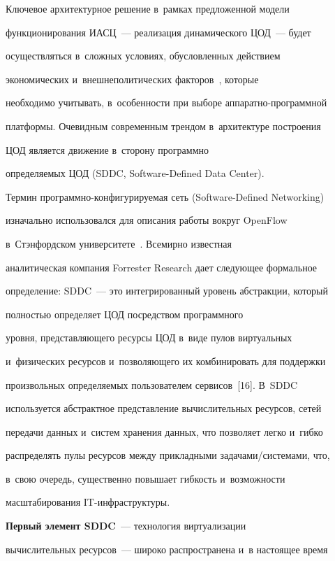 Ключевое архитектурное решение в~рамках предложенной модели 


функционирования ИАСЦ~--- реализация динамического ЦОД~--- будет 


осуществляться в~сложных условиях, обусловленных действием 


экономических и~внешнеполитических факторов~\cite{5-bs}, которые 


необходимо учитывать, в~особенности при выборе ап\-па\-рат\-но-программной 


платформы. Очевидным современным трендом в~архитектуре построения 


ЦОД является движение в~сторону программно 


определяемых ЦОД (SDDC, Software-Defined Data Center).





Термин программно-конфигурируемая сеть (Software-Defined Networking) 


изначально использовался для описания работы вокруг OpenFlow 


в~Стэнфордском университете~\cite{15-bs}. Всемирно известная 


аналитическая компания Forrester Research дает следующее формальное 


определение: SDDC~--- это интегрированный уровень абстракции, который 


полностью определяет ЦОД посредством программного 


уровня, представляющего ресурсы ЦОД в~виде пулов виртуальных 


и~физических ресурсов и~позволяющего их комбинировать для поддержки 


произвольных определяемых пользователем сервисов~[16]. В~SDDC 


используется абстрактное представление вычислительных ресурсов, сетей 


передачи данных и~систем хранения данных, что позволяет легко и~гибко 


распределять пулы ресурсов между прикладными задачами\!/\!системами, что, 


в~свою очередь, существенно повышает гибкость и~возможности 


масштабирования IT-инф\-ра\-струк\-туры.





\textbf{Первый элемент SDDC}~--- технология виртуализации 


вычислительных ресурсов~--- широко распространена и~в настоящее время 


